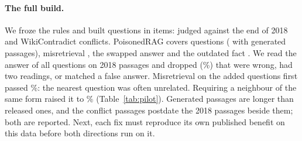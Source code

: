 \paragraph{The full build.} We froze the rules and built
\NSdFullQuestions{} questions in \NSdFullItems{} items: \NSdFullWiki{} judged
against the end of 2018 and \NSdFullWc{} WikiContradict conflicts.
PoisonedRAG covers \NSdFullQPrag{} questions (\NSdFullQPragGenerated{} with
generated passages), misretrieval \NSdFullQMisr{}, the swapped answer
\NSdFullQSwap{} and the outdated fact \NSdFullQOutd{}. We read the answer of
all \NSdKeyRead{} questions on 2018 passages and dropped \NSdKeyDropped{}
(\PctSdKeyDropped{}\%) that were wrong, had two readings, or matched a false
answer. Misretrieval on the added questions first passed
\PctSdFullMisrLooseOk{}\%: the nearest question was often unrelated.
Requiring a neighbour of the same form raised it to \PctSdFullMisrOk{}\%
(Table~\ref{tab:pilot}). Generated passages are longer than released ones,
and the conflict passages postdate the 2018 passages beside them; both are
reported. Next, each fix must reproduce its own published benefit on this
data before both directions run on it.
